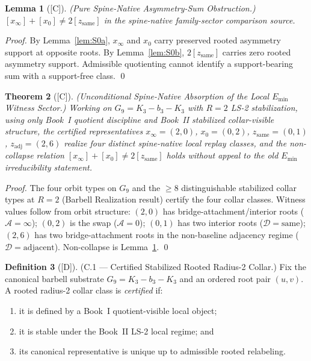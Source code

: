 \documentclass[12pt,oneside]{amsbook}
\theoremstyle{plain}
\newtheorem{theorem}{Theorem}[section]
\newtheorem{lemma}[theorem]{Lemma}
\theoremstyle{definition}
\newtheorem{definition}[theorem]{Definition}
\theoremstyle{remark}
\newcommand{\status}[1]{\textup{[#1]}}
\begin{document}
\begin{lemma}[\status{C}]\label{lem:S0}
\textup{(Pure Spine-Native Asymmetry-Sum Obstruction.)}
$[x_\infty] + [x_0] \neq 2[z_{\mathrm{same}}]$
in the spine-native family-sector comparison source.
\end{lemma}

\begin{proof}
By Lemma~\ref{lem:S0a}, $x_\infty$ and $x_0$ carry preserved
rooted asymmetry support at opposite roots.  By Lemma~\ref{lem:S0b},
$2[z_{\mathrm{same}}]$ carries zero rooted asymmetry support.
Admissible quotienting cannot identify a support-bearing sum with a
support-free class. \qed
\end{proof}

\begin{theorem}[\status{C}]\label{thm:spine-native-absorption}
\textup{(Unconditional Spine-Native Absorption of the Local
$E_{\min}$ Witness Sector.)}
Working on $G_9 = K_3 - b_3 - K_3$ with $R=2$ LS-2 stabilization,
using only Book~I quotient discipline and Book~II stabilized
collar-visible structure, the certified representatives
$x_\infty=(2,0)$, $x_0=(0,2)$, $z_{\mathrm{same}}=(0,1)$,
$z_{\mathrm{adj}}=(2,6)$ realize four distinct spine-native local
replay classes, and the non-collapse relation
$[x_\infty]+[x_0] \neq 2[z_{\mathrm{same}}]$
holds without appeal to the old $E_{\min}$ irreducibility statement.
\end{theorem}

\begin{proof}
The four orbit types on $G_9$ and the $\geq 8$ distinguishable
stabilized collar types at $R=2$ (Barbell Realization result) certify
the four collar classes.  Witness values follow from orbit structure:
$(2,0)$ has bridge-attachment/interior roots ($\mathcal{A}=\infty$);
$(0,2)$ is the swap ($\mathcal{A}=0$); $(0,1)$ has two interior roots
($\mathcal{D}=\mathrm{same}$); $(2,6)$ has two bridge-attachment roots
in the non-baseline adjacency regime ($\mathcal{D}=\mathrm{adjacent}$).
Non-collapse is Lemma~\ref{lem:S0}. \qed
\end{proof}


\begin{definition}[\status{D}]\label{def:cert-collar-C1}
\textup{(C.1 --- Certified Stabilized Rooted Radius-2 Collar.)}
Fix the canonical barbell substrate $G_9 = K_3 - b_3 - K_3$ and an
ordered root pair $(u,v)$.  A rooted radius-2 collar class is
\emph{certified} if:
\begin{enumerate}[label=\textup{(\arabic*)}]
  \item it is defined by a Book~I quotient-visible local object;
  \item it is stable under the Book~II LS-2 local regime; and
  \item its canonical representative is unique up to admissible rooted
    relabeling.
\end{enumerate}
\end{definition}
\end{document}
